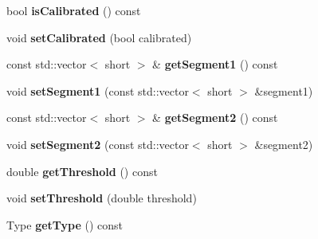 \begin{DoxyCompactItemize}
\item 
bool {\bfseries is\+Calibrated} () const \hypertarget{classinsight_1_1DistanceFaceFeature_afe7f617527f31944a4f7550c8d64229d}{}\label{classinsight_1_1DistanceFaceFeature_afe7f617527f31944a4f7550c8d64229d}

\item 
void {\bfseries set\+Calibrated} (bool calibrated)\hypertarget{classinsight_1_1DistanceFaceFeature_a3c579d899155522a042c0cecc7f9e244}{}\label{classinsight_1_1DistanceFaceFeature_a3c579d899155522a042c0cecc7f9e244}

\item 
const std\+::vector$<$ short $>$ \& {\bfseries get\+Segment1} () const \hypertarget{classinsight_1_1DistanceFaceFeature_ac49f0fa91070070141c8930bc0c9d736}{}\label{classinsight_1_1DistanceFaceFeature_ac49f0fa91070070141c8930bc0c9d736}

\item 
void {\bfseries set\+Segment1} (const std\+::vector$<$ short $>$ \&segment1)\hypertarget{classinsight_1_1DistanceFaceFeature_a85dc6acf1f6e17b07bff80213fc1509a}{}\label{classinsight_1_1DistanceFaceFeature_a85dc6acf1f6e17b07bff80213fc1509a}

\item 
const std\+::vector$<$ short $>$ \& {\bfseries get\+Segment2} () const \hypertarget{classinsight_1_1DistanceFaceFeature_a7f4795a78b26d26954af803b8aa2edf6}{}\label{classinsight_1_1DistanceFaceFeature_a7f4795a78b26d26954af803b8aa2edf6}

\item 
void {\bfseries set\+Segment2} (const std\+::vector$<$ short $>$ \&segment2)\hypertarget{classinsight_1_1DistanceFaceFeature_a5f8a41d517649e5a8d97a766229e0bad}{}\label{classinsight_1_1DistanceFaceFeature_a5f8a41d517649e5a8d97a766229e0bad}

\item 
double {\bfseries get\+Threshold} () const \hypertarget{classinsight_1_1DistanceFaceFeature_ab04e9ffaf70117eade948fd7f8dfae78}{}\label{classinsight_1_1DistanceFaceFeature_ab04e9ffaf70117eade948fd7f8dfae78}

\item 
void {\bfseries set\+Threshold} (double threshold)\hypertarget{classinsight_1_1DistanceFaceFeature_a761e09fd2830020711a6d18f0e74b28d}{}\label{classinsight_1_1DistanceFaceFeature_a761e09fd2830020711a6d18f0e74b28d}

\item 
Type {\bfseries get\+Type} () const \hypertarget{classinsight_1_1DistanceFaceFeature_ac92e2f7c9c4a4ef232fcc7902aa73f86}{}\label{classinsight_1_1DistanceFaceFeature_ac92e2f7c9c4a4ef232fcc7902aa73f86}


\end{DoxyCompactItemize}
